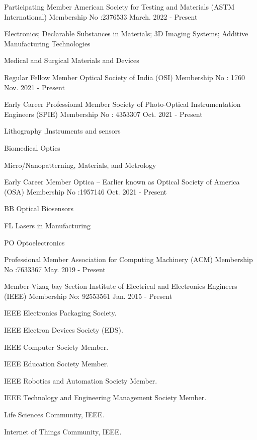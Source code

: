 \begin{cventries}
\cventry
    {Participating Member }
    { American Society for Testing and Materials (ASTM International)}
    {Membership No :2376533 }
    {March. 2022 - Present}
{
	 \begin{cvitems}
	\item {Electronics; Declarable Substances in Materials; 3D Imaging Systems; Additive Manufacturing Technologies}
	\item {Medical and Surgical Materials and Devices}
	\end{cvitems}
}
\cventry
    {Regular Fellow Member }
    { Optical Society of India (OSI)}
    {Membership No : 1760}
    {Nov. 2021 - Present}
{
 \begin{cvitems}
\end{cvitems}
}
\cventry
    {Early Career Professional Member}
    {Society of Photo-Optical Instrumentation Engineers (SPIE)}
    {Membership No : 4353307}
    {Oct. 2021 - Present}
{
 \begin{cvitems}
\item {Lithography ,Instruments and sensors   }
\item {Biomedical Optics  }
\item {Micro/Nanopatterning, Materials, and Metrology }
\end{cvitems}
}
\cventry
    {Early Career	 Member}
    {Optica – Earlier known as Optical Society of America (OSA)}
    {Membership No :1957146 }
    {Oct. 2021 - Present}
{
 \begin{cvitems}
\item {BB Optical Biosensors   }
\item {FL Lasers in Manufacturing }
\item {PO Optoelectronics }
\end{cvitems}
}
\cventry
    {Professional Member}
    {Association for Computing Machinery (ACM)}
    {Membership No :7633367 }
    {May. 2019 - Present}
{
 \begin{cvitems}
\end{cvitems}
}
  \cventry
    { Member-Vizag bay  Section}
    {Institute of Electrical and Electronics Engineers (IEEE)}
    {Membership No: 92553561}
    {Jan. 2015 - Present}
    {
      \begin{cvitems}
	\item {IEEE Electronics Packaging Society.}
	\item {IEEE Electron Devices Society (EDS).}
        \item {IEEE Computer Society Member.}
        \item {IEEE Education Society Member.}
        \item {IEEE Robotics and Automation Society Member.}
        \item {IEEE Technology and Engineering Management Society Member.}
        \item {Life Sciences Community, IEEE.}
        \item {Internet of Things Community, IEEE.}
      \end{cvitems}
    }
  

\end{cventries}
